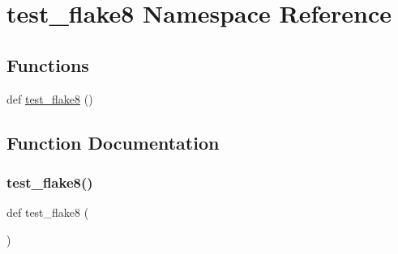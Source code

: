 \hypertarget{namespacetest__flake8}{}\section{test\+\_\+flake8 Namespace Reference}
\label{namespacetest__flake8}
\subsection*{Functions}
\begin{DoxyCompactItemize}
\item 
def \mbox{\hyperlink{namespacetest__flake8_aa432f7c99ec194d023be50667e1b897a}{test\+\_\+flake8}} ()
\end{DoxyCompactItemize}


\subsection{Function Documentation}
\mbox{\label{namespacetest__flake8_aa432f7c99ec194d023be50667e1b897a}} 
\subsubsection{\texorpdfstring{test\+\_\+flake8()}{test\_flake8()}}
{\footnotesize\ttfamily def test\+\_\+flake8 (\begin{DoxyParamCaption}{ }\end{DoxyParamCaption})}

